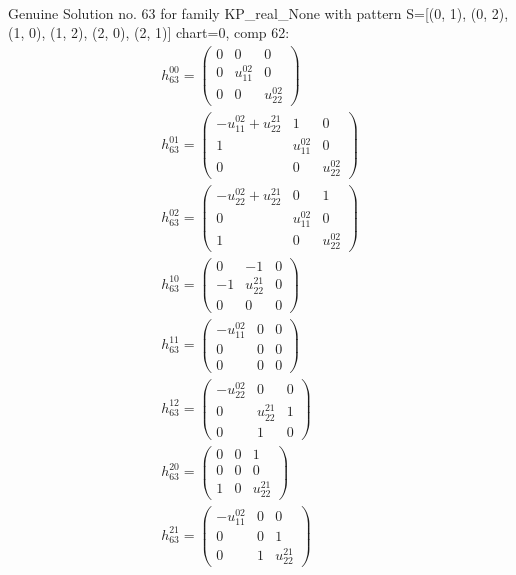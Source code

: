 \documentclass[a4paper, 11pt, twoside, onecolumn]{article}
\begin{document}
\begin{landscape}
\begin{gather*}
\end{gather*} 
Genuine Solution no. 63 for family KP_real_None with pattern S=[(0, 1), (0, 2), (1, 0), (1, 2), (2, 0), (2, 1)] chart=0, comp 62: 
\begin{gather*} 
	 h_{63}^{00}=\begin{pmatrix}0 & 0 & 0\\0 & u^{02}_{11} & 0\\0 & 0 & u^{02}_{22}\end{pmatrix}\\ 
	 h_{63}^{01}=\begin{pmatrix}- u^{02}_{11} + u^{21}_{22} & 1 & 0\\1 & u^{02}_{11} & 0\\0 & 0 & u^{02}_{22}\end{pmatrix}\\ 
	 h_{63}^{02}=\begin{pmatrix}- u^{02}_{22} + u^{21}_{22} & 0 & 1\\0 & u^{02}_{11} & 0\\1 & 0 & u^{02}_{22}\end{pmatrix}\\ 
	 h_{63}^{10}=\begin{pmatrix}0 & -1 & 0\\-1 & u^{21}_{22} & 0\\0 & 0 & 0\end{pmatrix}\\ 
	 h_{63}^{11}=\begin{pmatrix}- u^{02}_{11} & 0 & 0\\0 & 0 & 0\\0 & 0 & 0\end{pmatrix}\\ 
	 h_{63}^{12}=\begin{pmatrix}- u^{02}_{22} & 0 & 0\\0 & u^{21}_{22} & 1\\0 & 1 & 0\end{pmatrix}\\ 
	 h_{63}^{20}=\begin{pmatrix}0 & 0 & 1\\0 & 0 & 0\\1 & 0 & u^{21}_{22}\end{pmatrix}\\ 
	 h_{63}^{21}=\begin{pmatrix}- u^{02}_{11} & 0 & 0\\0 & 0 & 1\\0 & 1 & u^{21}_{22}\end{pmatrix}\\ 

\end{gather*}
\end{landscape}
\end{document}
